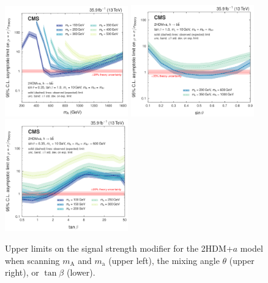 \begin{figure}[htbp]
  \centering
  \includegraphics[width=0.475\textwidth]{figures/limits/limits_2hdma_mass.pdf}
  \includegraphics[width=0.475\textwidth]{figures/limits/limits_2hdma_sinp.pdf}\\
  \includegraphics[width=0.475\textwidth]{figures/limits/limits_2hdma_tanb.pdf}\\
  \caption{Upper limits on the signal strength modifier for the 2HDM+$a$ model when scanning $m_\text{A}$ and $m_\text{a}$ (upper left), the mixing angle $\theta$ (upper right), or $\tan\beta$ (lower).}
  \label{fig:limits_2hdma}
\end{figure}



